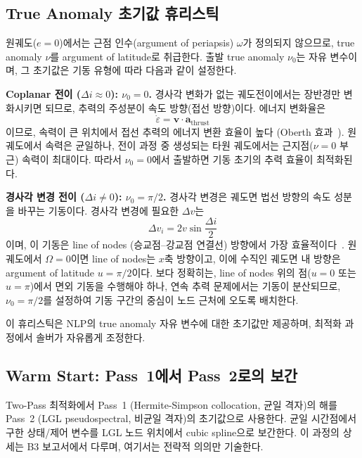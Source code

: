 \documentclass[11pt]{article}
\begin{document}
\subsection{True Anomaly 초기값 휴리스틱}
\label{sec:nu_heuristic}

원궤도($e = 0$)에서는 근점 인수(argument of periapsis) $\omega$가 정의되지 않으므로,
true anomaly $\nu$를 argument of latitude로 취급한다.
출발 true anomaly $\nu_0$는 자유 변수이며, 그 초기값은 기동 유형에 따라 다음과 같이 설정한다.

\textbf{Coplanar 전이 ($\Delta i \approx 0$): $\nu_0 = 0$.}
경사각 변화가 없는 궤도전이에서는 장반경만 변화시키면 되므로, 추력의 주성분이 속도 방향(접선 방향)이다.
에너지 변화율은
\[
\dot{\varepsilon} = \mathbf{v} \cdot \mathbf{a}_{\text{thrust}}
\]
이므로, 속력이 큰 위치에서 접선 추력의 에너지 변환 효율이 높다 (Oberth 효과~\cite{Oberth1972}).
원궤도에서 속력은 균일하나, 전이 과정 중 생성되는 타원 궤도에서는 근지점($\nu = 0$ 부근) 속력이 최대이다.
따라서 $\nu_0 = 0$에서 출발하면 기동 초기의 추력 효율이 최적화된다.

\textbf{경사각 변경 전이 ($\Delta i \ne 0$): $\nu_0 = \pi/2$.}
경사각 변경은 궤도면 법선 방향의 속도 성분을 바꾸는 기동이다. 경사각 변경에 필요한 $\Delta v$는
\[
\Delta v_i = 2v \sin\frac{\Delta i}{2}
\]
이며, 이 기동은 line of nodes (승교점--강교점 연결선) 방향에서 가장 효율적이다~\cite{Curtis2020}.
원궤도에서 $\Omega = 0$이면 line of nodes는 $x$축 방향이고,
이에 수직인 궤도면 내 방향은 argument of latitude $u = \pi/2$이다.
보다 정확히는, line of nodes 위의 점($u = 0$ 또는 $u = \pi$)에서 면외 기동을 수행해야 하나,
연속 추력 문제에서는 기동이 분산되므로, $\nu_0 = \pi/2$를 설정하여 기동 구간의 중심이 노드 근처에 오도록 배치한다.

이 휴리스틱은 NLP의 true anomaly 자유 변수에 대한 초기값만 제공하며, 최적화 과정에서 솔버가 자유롭게 조정한다.


\subsection{Warm Start: Pass~1에서 Pass~2로의 보간}
\label{sec:warm_start}

Two-Pass 최적화에서 Pass~1 (Hermite-Simpson collocation, 균일 격자)의 해를 Pass~2 (LGL pseudospectral, 비균일 격자)의 초기값으로 사용한다.
균일 시간점에서 구한 상태/제어 변수를 LGL 노드 위치에서 cubic spline으로 보간한다.
이 과정의 상세는 B3 보고서에서 다루며, 여기서는 전략적 의의만 기술한다.
\end{document}
